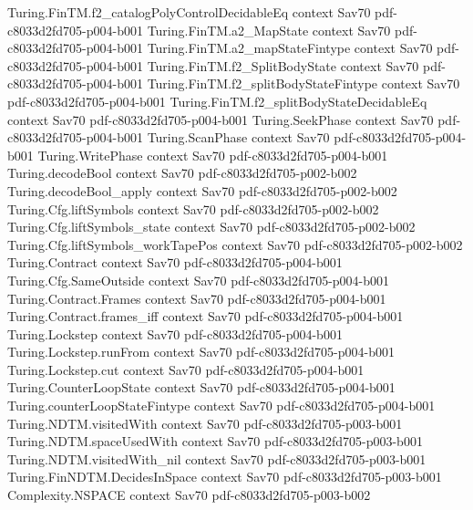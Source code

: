 \begin{theorem}
\proofstep
  {Turing.FinTM.f2_catalogPolyControlDecidableEq}
  {context}
  {Sav70}
  {pdf-c8033d2fd705-p004-b001}
\proofstep
  {Turing.FinTM.a2_MapState}
  {context}
  {Sav70}
  {pdf-c8033d2fd705-p004-b001}
\proofstep
  {Turing.FinTM.a2_mapStateFintype}
  {context}
  {Sav70}
  {pdf-c8033d2fd705-p004-b001}
\proofstep
  {Turing.FinTM.f2_SplitBodyState}
  {context}
  {Sav70}
  {pdf-c8033d2fd705-p004-b001}
\proofstep
  {Turing.FinTM.f2_splitBodyStateFintype}
  {context}
  {Sav70}
  {pdf-c8033d2fd705-p004-b001}
\proofstep
  {Turing.FinTM.f2_splitBodyStateDecidableEq}
  {context}
  {Sav70}
  {pdf-c8033d2fd705-p004-b001}
\proofstep
  {Turing.SeekPhase}
  {context}
  {Sav70}
  {pdf-c8033d2fd705-p004-b001}
\proofstep
  {Turing.ScanPhase}
  {context}
  {Sav70}
  {pdf-c8033d2fd705-p004-b001}
\proofstep
  {Turing.WritePhase}
  {context}
  {Sav70}
  {pdf-c8033d2fd705-p004-b001}
\proofstep
  {Turing.decodeBool}
  {context}
  {Sav70}
  {pdf-c8033d2fd705-p002-b002}
\proofstep
  {Turing.decodeBool_apply}
  {context}
  {Sav70}
  {pdf-c8033d2fd705-p002-b002}
\proofstep
  {Turing.Cfg.liftSymbols}
  {context}
  {Sav70}
  {pdf-c8033d2fd705-p002-b002}
\proofstep
  {Turing.Cfg.liftSymbols_state}
  {context}
  {Sav70}
  {pdf-c8033d2fd705-p002-b002}
\proofstep
  {Turing.Cfg.liftSymbols_workTapePos}
  {context}
  {Sav70}
  {pdf-c8033d2fd705-p002-b002}
\proofstep
  {Turing.Contract}
  {context}
  {Sav70}
  {pdf-c8033d2fd705-p004-b001}
\proofstep
  {Turing.Cfg.SameOutside}
  {context}
  {Sav70}
  {pdf-c8033d2fd705-p004-b001}
\proofstep
  {Turing.Contract.Frames}
  {context}
  {Sav70}
  {pdf-c8033d2fd705-p004-b001}
\proofstep
  {Turing.Contract.frames_iff}
  {context}
  {Sav70}
  {pdf-c8033d2fd705-p004-b001}
\proofstep
  {Turing.Lockstep}
  {context}
  {Sav70}
  {pdf-c8033d2fd705-p004-b001}
\proofstep
  {Turing.Lockstep.runFrom}
  {context}
  {Sav70}
  {pdf-c8033d2fd705-p004-b001}
\proofstep
  {Turing.Lockstep.cut}
  {context}
  {Sav70}
  {pdf-c8033d2fd705-p004-b001}
\proofstep
  {Turing.CounterLoopState}
  {context}
  {Sav70}
  {pdf-c8033d2fd705-p004-b001}
\proofstep
  {Turing.counterLoopStateFintype}
  {context}
  {Sav70}
  {pdf-c8033d2fd705-p004-b001}
\proofstep
  {Turing.NDTM.visitedWith}
  {context}
  {Sav70}
  {pdf-c8033d2fd705-p003-b001}
\proofstep
  {Turing.NDTM.spaceUsedWith}
  {context}
  {Sav70}
  {pdf-c8033d2fd705-p003-b001}
\proofstep
  {Turing.NDTM.visitedWith_nil}
  {context}
  {Sav70}
  {pdf-c8033d2fd705-p003-b001}
\proofstep
  {Turing.FinNDTM.DecidesInSpace}
  {context}
  {Sav70}
  {pdf-c8033d2fd705-p003-b001}
\proofstep
  {Complexity.NSPACE}
  {context}
  {Sav70}
  {pdf-c8033d2fd705-p003-b002}

\end{theorem}
